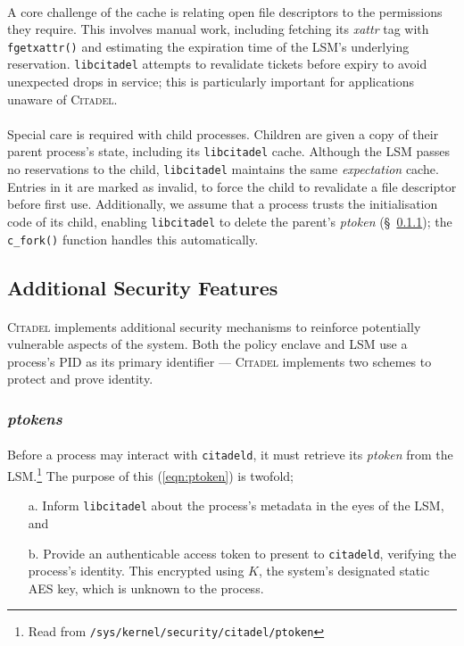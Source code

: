 \paragraph{} A core challenge of the cache is relating open file descriptors to the permissions they require. This involves manual work, including fetching its \textit{xattr} tag with \texttt{fgetxattr()} and estimating the expiration time of the LSM's underlying reservation. \texttt{libcitadel} attempts to revalidate tickets before expiry to avoid unexpected drops in service; this is particularly important for applications unaware of \textsc{Citadel}.

\paragraph{} Special care is required with child processes. Children are given a copy of their parent process's state, including its \texttt{libcitadel} cache. Although the LSM passes no reservations to the child, \texttt{libcitadel} maintains the same \textit{expectation} cache. Entries in it are marked as invalid, to force the child to revalidate a file descriptor before first use. Additionally, we assume that a process trusts the initialisation code of its child, enabling \texttt{libcitadel} to delete the parent's \textit{ptoken} (§~\ref{sec:ptokens}); the \texttt{c\_fork()} function handles this automatically.


\subsection{Additional Security Features}
\label{sec:additional-security}
\paragraph{} \textsc{Citadel} implements additional security mechanisms to reinforce potentially vulnerable aspects of the system. Both the policy enclave and LSM use a process's PID as its primary identifier --- \textsc{Citadel} implements two schemes to protect and prove identity.

\subsubsection{\textit{ptokens}}
\label{sec:ptokens}
\paragraph{} Before a process may interact with \texttt{citadeld}, it must retrieve its \textit{ptoken} from the LSM.\footnote{Read from \texttt{/sys/kernel/security/citadel/ptoken}} The purpose of this (\ref{eqn:ptoken}) is twofold;
\begin{enumerate}
    \item[a.] Inform \texttt{libcitadel} about the process's metadata in the eyes of the LSM, and
    \item[b.] Provide an authenticable access token to present to \texttt{citadeld}, verifying the process's identity. This encrypted using $K$, the system's designated static AES key, which is unknown to the process. 
\end{enumerate}

